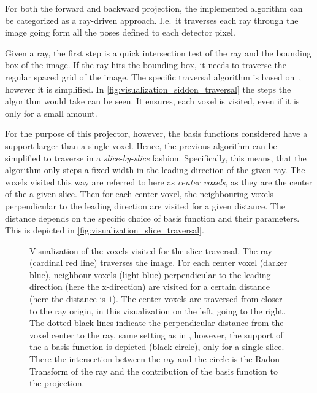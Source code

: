 For both the forward and backward projection, the implemented algorithm can be categorized as a
ray-driven approach. I.e.\ it traverses each ray through the image going form all the poses defined
to each detector pixel.

Given a ray, the first step is a quick intersection test of the ray and the bounding box of the
image. If the ray hits the bounding box, it needs to traverse the regular spaced grid of the image.
The specific traversal algorithm is based on~\cite{amanatides_fast_1987}, however it is simplified.
In \autoref{fig:visualization_siddon_traversal} the steps the algorithm would take can be seen. It
ensures, each voxel is visited, even if it is only for a small amount.

For the purpose of this projector, however, the basis functions considered have a support larger
than a single voxel. Hence, the previous algorithm can be simplified to traverse in a
\textit{slice-by-slice} fashion. Specifically, this means, that the algorithm only steps a fixed
width in the leading direction of the given ray. The voxels visited this way are referred to here as
\textit{center voxels}, as they are the center of the a given slice. Then for each center voxel, the
neighbouring voxels perpendicular to the leading direction are visited for a given distance. The
distance depends on the specific choice of basis function and their parameters. This is depicted in
\autoref{fig:visualization_slice_traversal}.

\begin{figure}[H]
	\centering
	\caption{ Visualization of the voxels visited
		for the slice traversal. The ray (cardinal red line) traverses the image. For each
		center voxel (darker blue), neighbour voxels (light blue) perpendicular to the
		leading direction (here the x-direction) are visited for a certain distance (here
		the distance is \(1\)). The center voxels are traversed from closer to the ray
		origin, in this visualization on the left, going to the right. The dotted black
		lines indicate the perpendicular distance from the voxel center to the ray.
		 same setting as in
		, however, the support of the a basis function is
		depicted (black circle), only for a single slice. There the intersection between the
		ray and the circle is the Radon Transform of the ray and the contribution of the
		basis function to the projection.
	}\label{fig:visualization_slice_traversal}
\end{figure}

